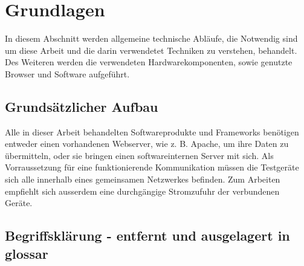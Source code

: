 \chapter{Grundlagen}
In diesem Abschnitt werden allgemeine technische Abläufe, die Notwendig sind um diese Arbeit und die darin verwendetet Techniken zu verstehen, behandelt. Des Weiteren werden die verwendeten Hardwarekomponenten, sowie genutzte Browser und Software aufgeführt.

	\section{Grundsätzlicher Aufbau}
	Alle in dieser Arbeit behandelten Softwareprodukte und Frameworks benötigen entweder einen vorhandenen Webserver, wie z. B. Apache, um ihre Daten zu übermitteln, oder sie bringen einen softwareinternen Server mit sich. Als Vorraussetzung für eine funktionierende Kommunikation müssen die Testgeräte sich alle innerhalb eines gemeinsamen Netzwerkes befinden. Zum Arbeiten empfiehlt sich ausserdem eine durchgängige Stromzufuhr der verbundenen Geräte.
	
	
	
	\section{Begriffsklärung - entfernt und ausgelagert in glossar}	
	
